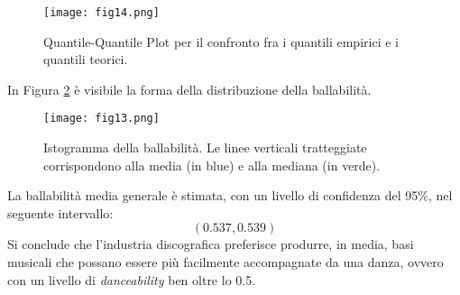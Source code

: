 \documentclass[fleqn,10pt]{SelfArx} %
\begin{document}
\begin{figure}[H]
    \centering
    \texttt{[image: fig14.png]}
    \caption{Quantile-Quantile Plot per il confronto fra i quantili empirici e i quantili teorici.}
    \label{fig:fig14}
\end{figure}
In Figura \ref{fig:fig13} è visibile la forma della distribuzione della ballabilità.
\begin{figure}[H]
    \centering
    \texttt{[image: fig13.png]}
    \caption{Istogramma della ballabilità. Le linee verticali tratteggiate corrispondono alla media (in blue) e alla mediana (in verde).}
    \label{fig:fig13}
\end{figure}
La ballabilità media generale è stimata, con un livello di confidenza del 95\%, nel seguente intervallo:
\begin{equation}
    (0.537, 0.539)
\end{equation}
Si conclude che l'industria discografica preferisce produrre, in media, basi musicali che possano essere più facilmente accompagnate da una danza, ovvero con un livello di \textit{danceability} ben oltre lo 0.5.
\end{document}
